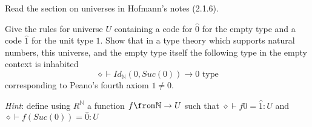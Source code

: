 \begin{exercise}
  Read the section on universes in Hofmann's notes (2.1.6).

  Give the rules for universe $U$ containing a code for $\hat{0}$ for the empty
  type and a code $\hat{1}$ for the unit type $1$. Show that in a type theory
  which supports natural numbers, this universe, and the empty type itself the
  following type in the empty context is inhabited
  \[
    \diamond \vdash Id_\mathbb{N}(0, Suc(0)) \to 0 \text{ type}
  \]
  corresponding to Peano's fourth axiom $1 \neq 0$.

  \emph{Hint}: define using $R^\mathbb{N}$ a function $f \from \mathbb{N} \to
  U$ such that $\diamond \vdash f 0 = \hat{1}: U$ and $\diamond \vdash
  f(Suc(0)) = \hat{0} : U$
\end{exercise}



